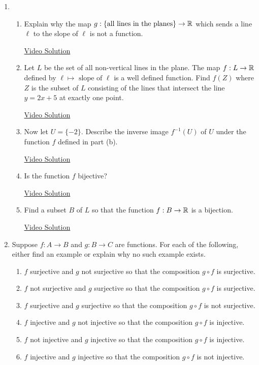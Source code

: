 \begin{enumerate}
\item \begin{enumerate}
    \item Explain why the map $g : \{\text{all lines in the planes}\} \to \mathbb{R}$ which sends a line $\ell$ to the slope of $\ell$ is not a function.
    
    \href{https://youtu.be/HHX_f3KIVUw}{Video Solution}
    
    \item Let $L$ be the set of all non-vertical lines in the plane. The map $f : L \to \mathbb{R}$ defined by $\ell \mapsto \text{ slope of } \ell$ is a well defined function. Find $f(Z)$ where $Z$ is the subset of $L$ consisting of the lines that intersect the line $y = 2x + 5$ at exactly one point. 
    
    \href{https://youtu.be/evTJt6VCg1Y}{Video Solution}
    
    \item Now let $U = \{ -2 \}$. Describe the inverse image $f^{-1}(U)$ of $U$ under the function $f$ defined in part (b).
    
    \href{https://youtu.be/FTLwdH1NZ-k}{Video Solution}
    
    \item Is the function  $f$ bijective? 
    
    \href{https://youtu.be/TklbTQpXrMo}{Video Solution}
    
    \item Find a subset $B$ of $L$ so that the function $f : B \to \mathbb{R}$  is a bijection.
    
    \href{https://youtu.be/eubplxO4Y_w}{Video Solution}
\end{enumerate}

\item Suppose $f : A \to B$ and $g : B \to C$ are functions. For each of the following, either find an example or explain why no such example exists.
\begin{enumerate}
    \item $f$ surjective and $g$ not surjective so that the composition $g \circ f$ is surjective. 
    \item $f$ not surjective and $g$ surjective so that the composition $g \circ f$ is surjective. 
    \item $f$ surjective and $g$ surjective so that the composition $g \circ f$ is not surjective. 
    \item $f$ injective and $g$ not injective so that the composition $g \circ f$ is injective.  
    \item $f$ not injective and $g$ injective so that the composition $g \circ f$ is injective.   
    \item $f$ injective and $g$ injective so that the composition $g \circ f$ is not injective.  
\end{enumerate}


\end{enumerate}
